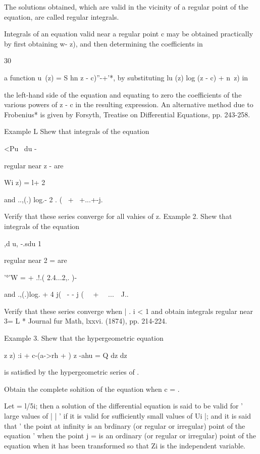 The solutions obtained, which are valid in the vicinity of a regular
point of the equation, are called regular integrals.

Integrals of an equation valid near a regular point c may be obtained
practically by first obtaining w- z), and then determining the
coefficients in

30

a function u\ (z) = S hn z - c)''-+'*, by substituting lu (z) log (z -
c) + n\ z) in

the left-hand side of the equation and equating to zero the
coefficients of the various powers of z - c in the resulting
expression. An alternative method due to Frobenius* is given by
Forsyth, Treatise on Differential Equations, pp. 243-258.

Example L Shew that integrals of the equation

<Pu \ du -

regular near z - are

Wi z) = l+ 2

and ..,(.) log.- 2 . ( \ + \ +...+-j.

Verify that these series converge for all vahies of z. Example 2. Shew
that integrals of the equation

,d u, -.sdu 1

regular near 2 = are

'°'W = + .!.( 2.4...2,. )-

and .,(.)log. + 4 j( \ - - j ( \ \ + \ \ ...\ \ J..

Verify that these series converge when | . i < 1 and obtain integrals
regular near 3= L * Journal fur Math, lxxvi. (1874), pp. 214-224.

%
%

Example 3. Shew that the hypergeometric equation

z z) :i + c-(a->rh + ) z -ahu = Q dz dz

is satisfied by the hypergeometric series of .

Obtain the complete sohition of the equation when c = .


Let = l/5i; then a solution of the differential equation is said to be
valid for ' large values of | | ' if it is valid for sufficiently
small values of Ui |; and it is said that ' the point at infinity is
an brdinary (or regular or irregular) point of the equation ' when the
point j = is an ordinary (or regular or irregular) point of the
equation when it has been transformed so that Zi is the independent
variable.

